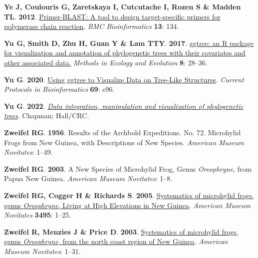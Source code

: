 \documentclass[
  letterpaper,
  DIV=11,
  numbers=noendperiod]{scrartcl}
\newlength{\cslhangindent}
\newenvironment{CSLReferences}[2] %
 {\begin{list}{}{%
  \setlength{\itemindent}{0pt}
  \setlength{\leftmargin}{0pt}
  \setlength{\parsep}{0pt}
  \ifodd #1
   \setlength{\leftmargin}{\cslhangindent}
   \setlength{\itemindent}{-1\cslhangindent}
  \fi
  \setlength{\itemsep}{#2\baselineskip}}}
 {\end{list}}
\begin{document}
\begin{CSLReferences}{0}{1}
\textbf{\textbf{Ye J}, \textbf{Coulouris G}, \textbf{Zaretskaya I},
\textbf{Cutcutache I}, \textbf{Rozen S} \& \textbf{Madden TL}}.
\textbf{2012}.
\href{https://doi.org/10.1186/1471-2105-13-134}{{Primer-BLAST: A tool to
design target-specific primers for polymerase chain reaction}}.
\emph{BMC Bioinformatics} \textbf{13}: 134.

\textbf{\textbf{Yu G}, \textbf{Smith D}, \textbf{Zhu H}, \textbf{Guan Y}
\& \textbf{Lam TTY}}. \textbf{2017}.
\href{https://doi.org/10.1111/2041-210X.12628}{{ggtree: an R package for
visualization and annotation of phylogenetic trees with their covariates
and other associated data.}} \emph{Methods in Ecology and Evolution}
\textbf{8}: 28--36.

\textbf{\textbf{Yu G}}. \textbf{2020}.
\href{https://doi.org/10.1002/cpbi.96}{{Using ggtree to Visualize Data
on Tree-Like Structures}}. \emph{Current Protocols in Bioinformatics}
\textbf{69}: e96.

\textbf{\textbf{Yu G}}. \textbf{2022}.
\emph{\href{https://doi.org/10.1201/9781003279242}{Data integration,
manipulation and visualization of phylogenetic trees}}. Chapman;
Hall/CRC.

\textbf{\textbf{Zweifel RG}}. \textbf{1956}. {Results of the Archbold
Expeditions. No. 72. Microhylid Frogs from New Guinea, with Descriptions
of New Species}. \emph{American Museum Novitates}: 1--49.

\textbf{\textbf{Zweifel RG}}. \textbf{2003}. {A New Species of
Microhylid Frog, Genus \emph{Oreophryne}, from Papua New Guinea}.
\emph{American Museum Novitates}: 1--8.

\textbf{\textbf{Zweifel RG}, \textbf{Cogger H} \& \textbf{Richards S}}.
\textbf{2005}.
\href{https://doi.org/10.1206/0003-0082(2005)495\%5B0001:SOMFGO\%5D2.0.CO;2}{{Systematics
of microhylid frogs, genus \emph{Oreophryne}, Living at High Elevations
in New Guinea}}. \emph{American Museum Novitates} \textbf{3495}: 1--25.

\textbf{\textbf{Zweifel R}, \textbf{Menzies J} \& \textbf{Price D}}.
\textbf{2003}.
\href{https://doi.org/10.1206/0003-0082(2003)415\%3C0001:SOMFGO\%3E2.0.CO;2}{{Systematics
of microhylid frogs, genus \emph{Oreophryne}, from the north coast
region of New Guinea}}. \emph{American Museum Novitates}: 1--31.

\end{CSLReferences}
\end{document}
